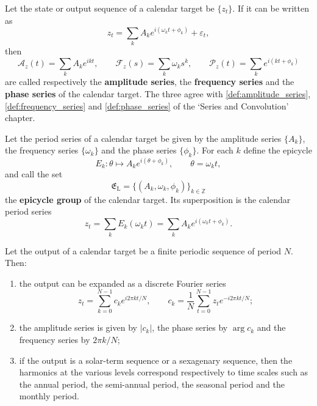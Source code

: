 \begin{definition}\label{def:calendar_series}
Let the state or output sequence of a calendar target be \(\{z_t\}\). If it can be written as
\[
z_t=\sum_k A_k e^{i(\omega_k t+\phi_k)}+\varepsilon_t,
\]
then
\[
\mathcal A_z(t)=\sum_k A_k e^{ikt},\qquad
\mathcal F_z(s)=\sum_k \omega_k s^k,\qquad
\mathcal P_z(t)=\sum_k e^{i(kt+\phi_k)}
\]
are called respectively the \textbf{amplitude series}, the \textbf{frequency series} and the \textbf{phase series} of the calendar target. The three agree with \cref{def:amplitude_series}, \cref{def:frequency_series} and \cref{def:phase_series} of the `Series and Convolution' chapter.
\end{definition}

\begin{definition}\label{def:calendar_epicycle_group}
Let the period series of a calendar target be given by the amplitude series \(\{A_k\}\), the frequency series \(\{\omega_k\}\) and the phase series \(\{\phi_k\}\). For each \(k\) define the epicycle
\[
E_k:\theta\mapsto A_k e^{i(\theta+\phi_k)},\qquad \theta=\omega_k t,
\]
and call the set
\[
\mathfrak E_{\mathrm{L}}=\{(A_k,\omega_k,\phi_k)\}_{k\in\mathbb Z}
\]
the \textbf{epicycle group} of the calendar target. Its superposition is the calendar period series
\[
z_t=\sum_k E_k(\omega_k t)=\sum_k A_k e^{i(\omega_k t+\phi_k)}.
\]
\end{definition}

\begin{theorem}\label{thm:calendar_series_reconstruction}
Let the output of a calendar target be a finite periodic sequence of period \(N\). Then:
\begin{enumerate}[label=(\roman*)]
    \item the output can be expanded as a discrete Fourier series
    \[
    z_t=\sum_{k=0}^{N-1}c_k e^{i2\pi kt/N},\qquad
    c_k=\frac1N\sum_{t=0}^{N-1}z_t e^{-i2\pi kt/N};
    \]
    \item the amplitude series is given by \(|c_k|\), the phase series by \(\arg c_k\) and the frequency series by \(2\pi k/N\);
    \item if the output is a solar-term sequence or a sexagenary sequence, then the harmonics at the various levels correspond respectively to time scales such as the annual period, the semi-annual period, the seasonal period and the monthly period.
\end{enumerate}
\end{theorem}

